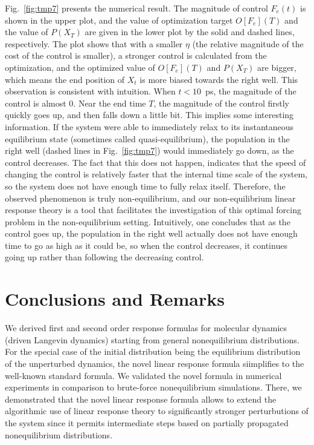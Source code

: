 \documentclass[aip,jcp,a4paper,reprint,onecolumn]{revtex4-1}
\begin{document}
Fig.~\ref{fig:tmp7} presents the numerical result. The magnitude of
control $F_e(t)$ is shown in the upper plot, and the value of
optimization target $O[F_e](T)$ and the value of $P( X_T)$ are
given in the lower plot by the solid and dashed lines, respectively.
The plot shows that with a smaller $\eta$ (the relative magnitude of
the cost of the control is smaller), a stronger control is calculated
from the optimization, and the optimized value of $O[F_e](T)$ and
$P( X_T)$ are bigger, which means the end position of $ X_t$
is more biased towards the right well. This observation is consistent
with intuition.  When $t<10$~ps, the magnitude of the control is
almost 0.  Near the end time $T$, the magnitude of the control firstly
quickly goes up, and then falls down a little bit.  This implies some
interesting information.  If the system were able to immediately relax
to its instantaneous equilibrium state (sometimes called
quasi-equilibrium), the population in the right well (dashed lines in
Fig.~\ref{fig:tmp7}) would immediately go down, as the control
decreases.  The fact that this does not happen, indicates that the
speed of changing the control is relatively faster that the internal
time scale of the system, so the system does not have enough time to
fully relax itself. Therefore, the observed phenomenon is truly
non-equilibrium, and our non-equilibrium linear response theory is a
tool that facilitates the investigation of this optimal forcing
problem in the non-equilibrium setting.  Intuitively, one concludes
that as the control goes up, the population in the right well actually
does not have enough time to go as high as it could be, so when the
control decreases, it continues going up rather than following the
decreasing control.




\section{Conclusions and Remarks}

We derived  first and second order response formulas for molecular dynamics (driven Langevin dynamics) starting from general nonequilibrium distributions. For the special case of the initial distribution being the equilibrium distribution of the unperturbed dynamics, the novel linear response formula siimplifies to the well-known standard formula. We validated the novel formula in numerical experiments in comparison to brute-force nonequilibrium simulations. There, we demonstrated that the novel linear response formula allows to extend the algorithmic use of linear response theory to significantly stronger perturbutions of the system since it permits intermediate steps based on partially propagated nonequilibrium distributions. 
\end{document}
